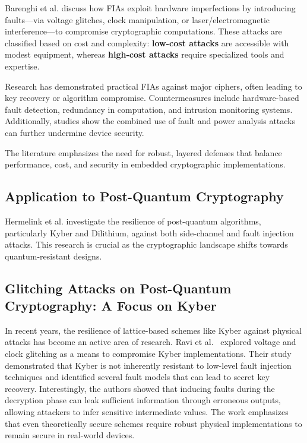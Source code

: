 Barenghi et al. \cite{6178001} discuss how FIAs exploit hardware imperfections by introducing faults—via voltage glitches, clock manipulation, or laser/electromagnetic interference—to compromise cryptographic computations. These attacks are classified based on cost and complexity: \textbf{low-cost attacks} are accessible with modest equipment, whereas \textbf{high-cost attacks} require specialized tools and expertise.

Research has demonstrated practical FIAs against major ciphers, often leading to key recovery or algorithm compromise. Countermeasures include hardware-based fault detection, redundancy in computation, and intrusion monitoring systems. Additionally, studies show the combined use of fault and power analysis attacks can further undermine device security.

The literature emphasizes the need for robust, layered defenses that balance performance, cost, and security in embedded cryptographic implementations.

\subsection*{Application to Post-Quantum Cryptography}
Hermelink et al. \cite{hermelink2023side} investigate the resilience of post-quantum algorithms, particularly Kyber and Dilithium, against both side-channel and fault injection attacks. This research is crucial as the cryptographic landscape shifts towards quantum-resistant designs.


\subsection*{Glitching Attacks on Post-Quantum Cryptography: A Focus on Kyber}

In recent years, the resilience of lattice-based schemes like Kyber against physical attacks has become an active area of research. Ravi et al.~\cite{ravi2021fault} explored voltage and clock glitching as a means to compromise Kyber implementations. Their study demonstrated that Kyber is not inherently resistant to low-level fault injection techniques and identified several fault models that can lead to secret key recovery. Interestingly, the authors showed that inducing faults during the decryption phase can leak sufficient information through erroneous outputs, allowing attackers to infer sensitive intermediate values. The work emphasizes that even theoretically secure schemes require robust physical implementations to remain secure in real-world devices.

